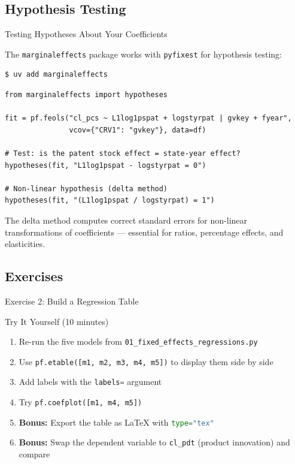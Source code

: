 \documentclass[9pt,aspectratio=169]{beamer}
\newcommand{\py}[1]{\lstinline[language=Python]{#1}}
\begin{document}
\subsection{Hypothesis Testing}
\begin{frame}[fragile]{Testing Hypotheses About Your Coefficients}

The \texttt{marginaleffects} package works with \texttt{pyfixest} for hypothesis testing:

\begin{lstlisting}[style=shell]
$ uv add marginaleffects
\end{lstlisting}

\begin{lstlisting}
from marginaleffects import hypotheses

fit = pf.feols("cl_pcs ~ L1log1pspat + logstyrpat | gvkey + fyear",
               vcov={"CRV1": "gvkey"}, data=df)

# Test: is the patent stock effect = state-year effect?
hypotheses(fit, "L1log1pspat - logstyrpat = 0")

# Non-linear hypothesis (delta method)
hypotheses(fit, "(L1log1pspat / logstyrpat) = 1")
\end{lstlisting}

\medskip

The \alert{delta method} computes correct standard errors for non-linear transformations of coefficients --- essential for ratios, percentage effects, and elasticities.

\end{frame}


\subsection{Exercises}
\begin{frame}[fragile]{Exercise 2: Build a Regression Table}

\begin{alertblock}{Try It Yourself (10 minutes)}
\begin{enumerate}
    \item Re-run the five models from \texttt{01\_fixed\_effects\_regressions.py}
    \item Use \py{pf.etable([m1, m2, m3, m4, m5])} to display them side by side
    \item Add labels with the \py{labels=} argument
    \item Try \py{pf.coefplot([m1, m4, m5])}
    \item \textbf{Bonus:} Export the table as \LaTeX{} with \py{type="tex"}
    \item \textbf{Bonus:} Swap the dependent variable to \texttt{cl\_pdt} (product innovation) and compare
\end{enumerate}
\end{alertblock}

\end{frame}
\end{document}

